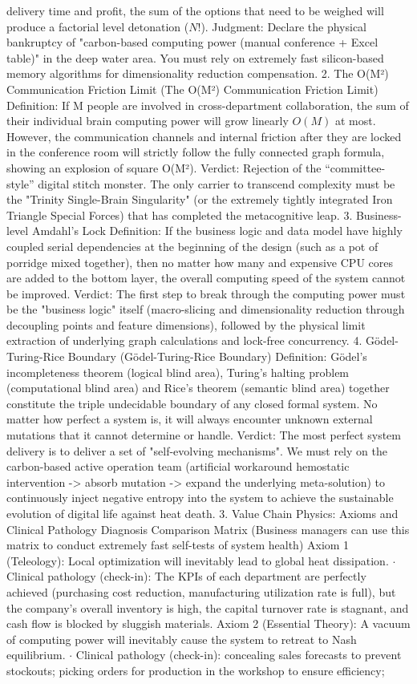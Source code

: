 \documentclass[11pt,a4paper]{article}
\begin{document}
delivery time and profit, the sum of the options that need to be weighed will produce a factorial level detonation ($N!$). Judgment: Declare the physical bankruptcy of "carbon-based computing power (manual conference + Excel table)" in the deep water area. You must rely on extremely fast silicon-based memory algorithms for dimensionality reduction compensation. 2. The O(M²) Communication Friction Limit (The O(M²) Communication Friction Limit) Definition: If M people are involved in cross-department collaboration, the sum of their individual brain computing power will grow linearly $O(M)$ at most. However, the communication channels and internal friction after they are locked in the conference room will strictly follow the fully connected graph formula, showing an explosion of square O(M²). Verdict: Rejection of the “committee-style” digital stitch monster. The only carrier to transcend complexity must be the "Trinity Single-Brain Singularity" (or the extremely tightly integrated Iron Triangle Special Forces) that has completed the metacognitive leap. 3. Business-level Amdahl's Lock Definition: If the business logic and data model have highly coupled serial dependencies at the beginning of the design (such as a pot of porridge mixed together), then no matter how many and expensive CPU cores are added to the bottom layer, the overall computing speed of the system cannot be improved. Verdict: The first step to break through the computing power must be the "business logic" itself (macro-slicing and dimensionality reduction through decoupling points and feature dimensions), followed by the physical limit extraction of underlying graph calculations and lock-free concurrency. 4. Gödel-Turing-Rice Boundary (Gödel-Turing-Rice Boundary) Definition: Gödel's incompleteness theorem (logical blind area), Turing's halting problem (computational blind area) and Rice's theorem (semantic blind area) together constitute the triple undecidable boundary of any closed formal system. No matter how perfect a system is, it will always encounter unknown external mutations that it cannot determine or handle. Verdict: The most perfect system delivery is to deliver a set of "self-evolving mechanisms". We must rely on the carbon-based active operation team (artificial workaround hemostatic intervention -> absorb mutation -> expand the underlying meta-solution) to continuously inject negative entropy into the system to achieve the sustainable evolution of digital life against heat death. 3. Value Chain Physics: Axioms and Clinical Pathology Diagnosis Comparison Matrix (Business managers can use this matrix to conduct extremely fast self-tests of system health) Axiom 1 (Teleology): Local optimization will inevitably lead to global heat dissipation. $\cdot$ Clinical pathology (check-in): The KPIs of each department are perfectly achieved (purchasing cost reduction, manufacturing utilization rate is full), but the company's overall inventory is high, the capital turnover rate is stagnant, and cash flow is blocked by sluggish materials. Axiom 2 (Essential Theory): A vacuum of computing power will inevitably cause the system to retreat to Nash equilibrium. $\cdot$ Clinical pathology (check-in): concealing sales forecasts to prevent stockouts; picking orders for production in the workshop to ensure efficiency; 
\end{document}
